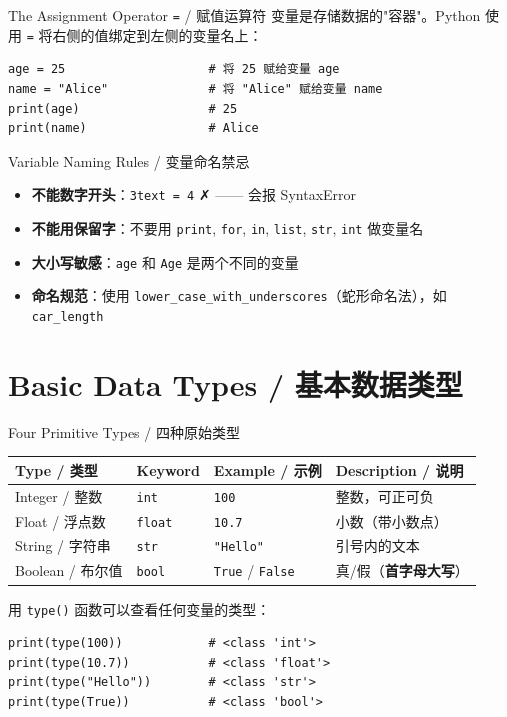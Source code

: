 \documentclass[11pt,a4paper]{report}
\let\oldtexttt\texttt
\renewcommand{\texttt}[1]{\textcolor{mainblue}{\oldtexttt{#1}}}
\begin{document}
\begin{concept}{The Assignment Operator \texttt{=} / 赋值运算符}
变量是存储数据的"容器"。Python 使用 \texttt{=} 将右侧的值绑定到左侧的变量名上：
\begin{lstlisting}
age = 25                    # 将 25 赋给变量 age
name = "Alice"              # 将 "Alice" 赋给变量 name
print(age)                  # 25
print(name)                 # Alice
\end{lstlisting}
\end{concept}

\begin{warning}{Variable Naming Rules / 变量命名禁忌}
\begin{itemize}[itemsep=0.3em]
    \item \textbf{不能数字开头}：\texttt{3text = 4} ✗ —— 会报 SyntaxError
    \item \textbf{不能用保留字}：不要用 \texttt{print}, \texttt{for}, \texttt{in}, \texttt{list}, \texttt{str}, \texttt{int} 做变量名
    \item \textbf{大小写敏感}：\texttt{age} 和 \texttt{Age} 是两个不同的变量
    \item \textbf{命名规范}：使用 \texttt{lower\_case\_with\_underscores}（蛇形命名法），如 \texttt{car\_length}
\end{itemize}
\end{warning}

\section{Basic Data Types / 基本数据类型}

\begin{concept}{Four Primitive Types / 四种原始类型}
\medskip
\centering
\renewcommand{\arraystretch}{1.6}
\begin{tabular}{@{}llll@{}}
\toprule
\textbf{Type / 类型} & \textbf{Keyword} & \textbf{Example / 示例} & \textbf{Description / 说明} \\ \midrule
Integer / 整数   & \texttt{int}   & \texttt{100}        & 整数，可正可负 \\
Float / 浮点数   & \texttt{float} & \texttt{10.7}       & 小数（带小数点） \\
String / 字符串  & \texttt{str}   & \texttt{"Hello"}    & 引号内的文本 \\
Boolean / 布尔值 & \texttt{bool}  & \texttt{True} / \texttt{False} & 真/假（\textbf{首字母大写}） \\ \bottomrule
\end{tabular}
\medskip

用 \texttt{type()} 函数可以查看任何变量的类型：
\begin{lstlisting}
print(type(100))            # <class 'int'>
print(type(10.7))           # <class 'float'>
print(type("Hello"))        # <class 'str'>
print(type(True))           # <class 'bool'>
\end{lstlisting}
\end{concept}
\end{document}

